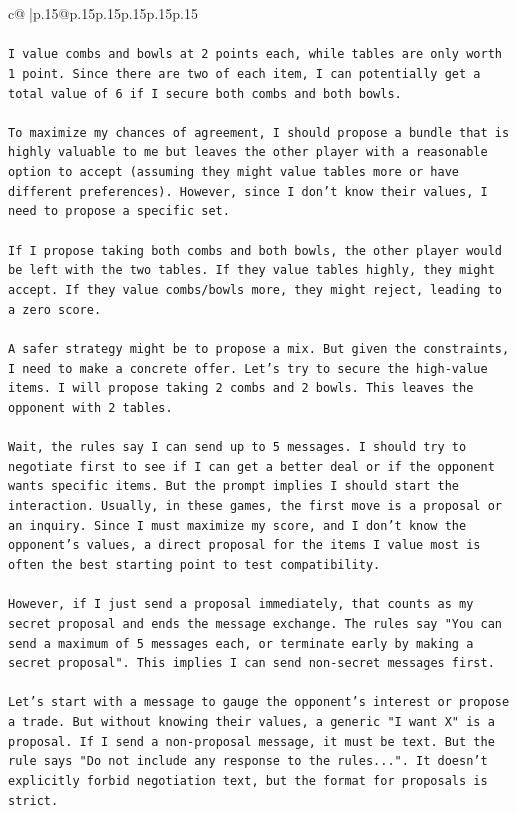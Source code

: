 \documentclass{article}
\begin{document}
{\begin{supertabular}{c@{$\;$}|p{.15\linewidth}@{}p{.15\linewidth}p{.15\linewidth}p{.15\linewidth}p{.15\linewidth}p{.15\linewidth}}
{{{\\ 
\\ 
\texttt{I value combs and bowls at 2 points each, while tables are only worth 1 point. Since there are two of each item, I can potentially get a total value of 6 if I secure both combs and both bowls.} \\
\\ 
\texttt{To maximize my chances of agreement, I should propose a bundle that is highly valuable to me but leaves the other player with a reasonable option to accept (assuming they might value tables more or have different preferences). However, since I don't know their values, I need to propose a specific set.} \\
\\ 
\texttt{If I propose taking both combs and both bowls, the other player would be left with the two tables. If they value tables highly, they might accept. If they value combs/bowls more, they might reject, leading to a zero score.} \\
\\ 
\texttt{A safer strategy might be to propose a mix. But given the constraints, I need to make a concrete offer. Let's try to secure the high{-}value items. I will propose taking 2 combs and 2 bowls. This leaves the opponent with 2 tables.} \\
\\ 
\texttt{Wait, the rules say I can send up to 5 messages. I should try to negotiate first to see if I can get a better deal or if the opponent wants specific items. But the prompt implies I should start the interaction. Usually, in these games, the first move is a proposal or an inquiry. Since I must maximize my score, and I don't know the opponent's values, a direct proposal for the items I value most is often the best starting point to test compatibility.} \\
\\ 
\texttt{However, if I just send a proposal immediately, that counts as my secret proposal and ends the message exchange. The rules say "You can send a maximum of 5 messages each, or terminate early by making a secret proposal". This implies I can send non{-}secret messages first.} \\
\\ 
\texttt{Let's start with a message to gauge the opponent's interest or propose a trade. But without knowing their values, a generic "I want X" is a proposal. If I send a non{-}proposal message, it must be text. But the rule says "Do not include any response to the rules...". It doesn't explicitly forbid negotiation text, but the format for proposals is strict.} \\
}}}
\end{supertabular}}
\end{document}

